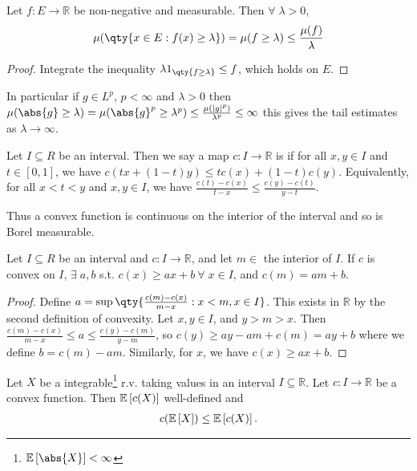 \begin{proposition}
	Let $f \colon E \to \mathbb R$ be non-negative and measurable.
	Then $\forall \; \lambda > 0$,
	\[ \mu(\qty{x \in E : f(x) \geq \lambda}) = \mu(f \geq \lambda) \leq \frac{\mu(f)}{\lambda} \]
\end{proposition}

\begin{proof}
	Integrate the inequality $\lambda 1_{\qty{f \geq \lambda}} \leq f$, which holds on $E$.
\end{proof}

In particular if $g \in L^p$, $p < \infty$ and $\lambda > 0$ then $\mu(\abs{g} \geq \lambda) = \mu(\abs{g}^p \geq \lambda^p) \leq \frac{\mu(|g|^p)}{\lambda^p} \leq \infty$ this gives the tail estimates as $\lambda \to \infty$.

\begin{definition}
	Let $I \subseteq R$ be an interval.
	Then we say a map $c \colon I \to \mathbb R$ is  if for all $x, y \in I$ and $t \in [0,1]$, we have $c(tx + (1-t)y) \leq tc(x) + (1-t)c(y)$.
	Equivalently, for all $x < t < y$ and $x, y \in I$, we have $\frac{c(t) - c(x)}{t-x} \leq \frac{c(y) - c(t)}{y-t}$.
\end{definition}

Thus a convex function is continuous on the interior of the interval and so is Borel measurable.

\begin{lemma}
	Let $I \subseteq R$ be an interval and $c : I \to \mathbb{R}$, and let $m \in$ the interior of $I$.
	If $c$ is convex on $I$, $\exists \; a, b$ s.t. $c(x) \geq ax + b \ \forall \; x \in I$, and $c(m) = am + b$.
\end{lemma}

\begin{proof}
	Define $a = \sup \qty{\frac{c(m) - c(x)}{m - x} : x < m, x \in I}$.
	This exists in $\mathbb R$ by the second definition of convexity.
	Let $x, y \in I$, and $y > m > x$.
	Then $\frac{c(m) - c(x)}{m - x} \leq a \leq \frac{c(y) - c(m)}{y - m}$, so $c(y) \geq ay - am + c(m) = ay + b$ where we define $b = c(m) - am$.
	Similarly, for $x$, we have $c(x) \geq ax + b$.
\end{proof}

\begin{theorem}
	Let $X$ be a integrable\footnote{$\expect{\abs{X}} < \infty$} r.v. taking values in an interval $I \subseteq \mathbb R$.
	Let $c \colon I \to \mathbb R$ be a convex function.
	Then $\mathbb{E}\left[{c(X)}\right]$ well-defined and
	\begin{align*}
		c(\mathbb{E}\left[{X}\right]) \leq \mathbb{E}\left[{c(X)}\right].
	\end{align*}
\end{theorem}

